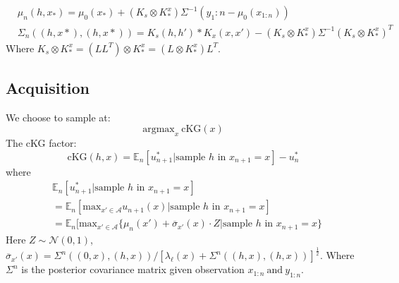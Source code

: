 \documentclass[12pt]{article}
\begin{document}
\begin{equation*}
\begin{aligned}
&\mu_n(h,x_*) = \mu_0(x_*)+(K_s \otimes K_*^x)\Sigma^{-1}(y_1:n - \mu_0(x_{1:n}))\\
&\Sigma_n((h,x*),(h,x*)) =  K_s(h,h')*K_x(x,x')- (K_s \otimes K_*^x)\Sigma^{-1}(K_s \otimes K_*^x)^T
\end{aligned}
\end{equation*}
Where $K_s \otimes K_*^x = (LL^T)\otimes K_*^x = (L\otimes K_*^x)L^T$.
\subsection{Acquisition}
We choose to sample at:
$$\text{argmax}_x\ \text{cKG}(x)$$
The cKG factor:
\begin{equation*}
\text{cKG}(h,x) =  \mathbb{E}_n[u_{n+1}^*|\text{sample $h$ in }x_{n+1} = x] - u_n^*
\end{equation*}
where
\begin{equation*}
\begin{aligned}
&\mathbb{E}_n[u_{n+1}^*|\text{sample $h$ in }x_{n+1} = x]\\
&=\mathbb{E}_n[\text{max}_{x'\in \mathcal{A}}u_{n+1}(x)|\text{sample $h$ in }x_{n+1} = x]\\
&=\mathbb{E}_n[\text{max}_{x'\in \mathcal{A}}\{\mu_n(x')+\overline{\sigma}_{x'}(x)\cdot Z|\text{sample $h$ in }x_{n+1} = x\}
\end{aligned}
\end{equation*}
Here $Z \sim \mathcal{N}(0,1)$, $\overline{\sigma}_{x'}(x)=\Sigma^n((0,x),(h,x))/[\lambda_{\ell}(x) + \Sigma^n((h,x),(h,x))]^{\frac{1}{2}}$. Where $\Sigma^n$ is the posterior covariance matrix given observation $x_{1:n}\ \text{and}\ y_{1:n}$.
\end{document}
